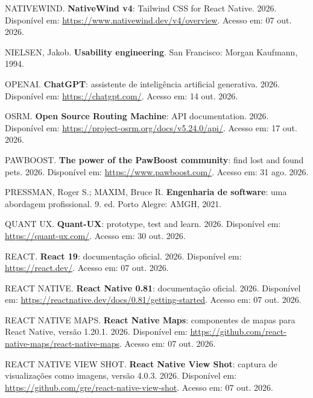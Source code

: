 \begin{flushleft}
\vspace{12pt}
\noindent NATIVEWIND. \textbf{NativeWind v4}: Tailwind CSS for React Native. 2026. Disponível em: \url{https://www.nativewind.dev/v4/overview}. Acesso em: 07 out. 2026.

\vspace{12pt}
\noindent NIELSEN, Jakob. \textbf{Usability engineering}. San Francisco: Morgan Kaufmann, 1994.

\vspace{12pt}
\noindent OPENAI. \textbf{ChatGPT}: assistente de inteligência artificial generativa. 2026. Disponível em: \url{https://chatgpt.com/}. Acesso em: 14 out. 2026.

\vspace{12pt}
\noindent OSRM. \textbf{Open Source Routing Machine}: API documentation. 2026. Disponível em: \url{https://project-osrm.org/docs/v5.24.0/api/}. Acesso em: 17 out. 2026.

\vspace{12pt}
\noindent PAWBOOST. \textbf{The power of the PawBoost community}: find lost and found pets. 2026. Disponível em: \url{https://www.pawboost.com/}. Acesso em: 31 ago. 2026.

\vspace{12pt}
\noindent PRESSMAN, Roger S.; MAXIM, Bruce R. \textbf{Engenharia de software}: uma abordagem profissional. 9. ed. Porto Alegre: AMGH, 2021.

\vspace{12pt}
\noindent QUANT UX. \textbf{Quant-UX}: prototype, test and learn. 2026. Disponível em: \url{https://quant-ux.com/}. Acesso em: 30 out. 2026.

\vspace{12pt}
\noindent REACT. \textbf{React 19}: documentação oficial. 2026. Disponível em: \url{https://react.dev/}. Acesso em: 07 out. 2026.

\vspace{12pt}
\noindent REACT NATIVE. \textbf{React Native 0.81}: documentação oficial. 2026. Disponível em: \url{https://reactnative.dev/docs/0.81/getting-started}. Acesso em: 07 out. 2026.

\vspace{12pt}
\noindent REACT NATIVE MAPS. \textbf{React Native Maps}: componentes de mapas para React Native, versão 1.20.1. 2026. Disponível em: \url{https://github.com/react-native-maps/react-native-maps}. Acesso em: 07 out. 2026.

\vspace{12pt}
\noindent REACT NATIVE VIEW SHOT. \textbf{React Native View Shot}: captura de visualizações como imagens, versão 4.0.3. 2026. Disponível em: \url{https://github.com/gre/react-native-view-shot}. Acesso em: 07 out. 2026.


\end{flushleft}
